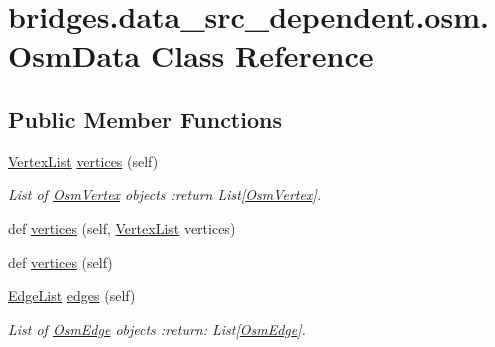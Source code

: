 \hypertarget{classbridges_1_1data__src__dependent_1_1osm_1_1_osm_data}{}\section{bridges.\+data\+\_\+src\+\_\+dependent.\+osm.\+Osm\+Data Class Reference}
\label{classbridges_1_1data__src__dependent_1_1osm_1_1_osm_data}
\subsection*{Public Member Functions}
\begin{DoxyCompactItemize}
\item 
\mbox{\hyperlink{classbridges_1_1data__src__dependent_1_1osm_1_1_osm_data_aa2bc633ab0d64a560165a1d55cc1f3a4}{Vertex\+List}} \mbox{\hyperlink{classbridges_1_1data__src__dependent_1_1osm_1_1_osm_data_a305ed03b001f5b753bb6cf291d4d1026}{vertices}} (self)
\begin{DoxyCompactList}\small\item\em List of \mbox{\hyperlink{classbridges_1_1data__src__dependent_1_1osm_1_1_osm_vertex}{Osm\+Vertex}} objects \+:return List\mbox{[}\mbox{\hyperlink{classbridges_1_1data__src__dependent_1_1osm_1_1_osm_vertex}{Osm\+Vertex}}\mbox{]}. \end{DoxyCompactList}\item 
def \mbox{\hyperlink{classbridges_1_1data__src__dependent_1_1osm_1_1_osm_data_a5282e6f6271377843c35618d4f90be29}{vertices}} (self, \mbox{\hyperlink{classbridges_1_1data__src__dependent_1_1osm_1_1_osm_data_aa2bc633ab0d64a560165a1d55cc1f3a4}{Vertex\+List}} vertices)
\item 
def \mbox{\hyperlink{classbridges_1_1data__src__dependent_1_1osm_1_1_osm_data_a9d254d1ef4043909d4d2bd4427daae39}{vertices}} (self)
\item 
\mbox{\hyperlink{classbridges_1_1data__src__dependent_1_1osm_1_1_osm_data_a18b0ef38dba7bedcddd29d38d71d91d2}{Edge\+List}} \mbox{\hyperlink{classbridges_1_1data__src__dependent_1_1osm_1_1_osm_data_a96e7f48b55ab3fe1f2f9a6b52442d233}{edges}} (self)
\begin{DoxyCompactList}\small\item\em List of \mbox{\hyperlink{classbridges_1_1data__src__dependent_1_1osm_1_1_osm_edge}{Osm\+Edge}} objects \+:return\+: List\mbox{[}\mbox{\hyperlink{classbridges_1_1data__src__dependent_1_1osm_1_1_osm_edge}{Osm\+Edge}}\mbox{]}. \end{DoxyCompactList}\item 

\end{DoxyCompactItemize}
